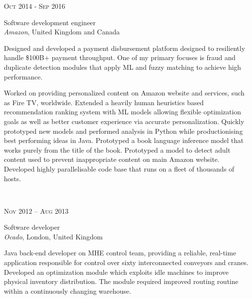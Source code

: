 \documentclass[10pt]{article} %
\begin{document}
{\begin{minipage}[t]{0.58\textwidth}

{\raggedleft\textsc{Oct 2014 - Sep 2016}\par}

{\raggedright\large Software development engineer\\
\textit{Amazon}, United Kingdom and Canada\\[5pt]}

\normalsize{Designed and developed a payment disbursement 
platform designed to resiliently handle \$100B+ payment throughput. 
One of my primary focuses is fraud and duplicate detection modules 
that apply ML and fuzzy matching to achieve high performance.

Worked on providing personalized content on Amazon website and services, such as Fire TV, worldwide.
Extended a heavily human heuristics based recommendation
ranking system with ML models allowing flexible
optimization goals as well as better customer experience via accurate personalization.
Quickly prototyped new models and performed analysis in Python
while productionising best performing ideas in Java.
Prototyped a book language inference model that works purely from the title of the book.
Prototyped a model to detect adult content used to prevent inappropriate content on main Amazon website.
Developed highly parallelisable code base that runs on a fleet of thousands of hosts.}\\


{\raggedleft\textsc{Nov 2012 – Aug 2013}\par}

{\raggedright\large Software developer\\
\textit{Ocado}, London, United Kingdom\\[5pt]}

\normalsize{Java back-end developer on MHE control team,
providing a reliable, real-time application responsible for
control over sixty interconnected conveyors and cranes.
Developed an optimization module which exploits idle machines
to improve physical inventory distribution.
The module required improved routing routine within a continuously changing warehouse.}\\



\end{minipage}}
\end{document}

